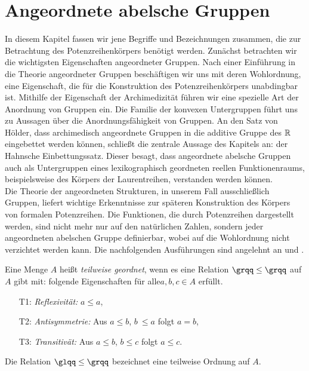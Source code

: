 \chapter{Angeordnete abelsche Gruppen}\label{chap2} %
In diesem Kapitel fassen wir jene Begriffe und Bezeichnungen zusammen, die zur Betrachtung des Potenzreihenkörpers benötigt werden. Zunächst betrachten wir die wichtigsten Eigenschaften angeordneter Gruppen. Nach einer Einführung in die Theorie angeordneter Gruppen beschäftigen wir uns mit deren Wohlordnung, eine Eigenschaft, die für die Konstruktion des Potenzreihenkörpers unabdingbar ist. Mithilfe der Eigenschaft der Archimedizität führen wir eine spezielle Art der Anordnung von Gruppen ein. Die Familie der konvexen Untergruppen führt uns zu Aussagen über die Anordnungsfähigkeit von Gruppen. An den Satz von Hölder, dass archimedisch angeordnete Gruppen in die additive Gruppe des $\mathbb{R}$ eingebettet werden können,  schließt die zentrale Aussage des Kapitels an: der Hahnsche Einbettungssatz. Dieser besagt, dass angeordnete abelsche Gruppen auch als Untergruppen eines lexikographisch geordneten reellen Funktionenraums, beispielsweise des Körpers der Laurentreihen, verstanden werden können. \\
Die Theorie der angeordneten Strukturen, in unserem Fall ausschließlich Gruppen, liefert wichtige Erkenntnisse zur späteren Konstruktion des Körpers von formalen Potenzreihen. Die Funktionen, die durch Potenzreihen dargestellt werden, sind nicht mehr nur auf den natürlichen Zahlen, sondern jeder angeordneten abelschen Gruppe definierbar, wobei auf die Wohlordnung nicht verzichtet werden kann. 
Die nachfolgenden Ausführungen sind angelehnt an \cite[S. 21 - 28]{fuchs66} und \cite[S. 1 -  4]{priesscrampe83}.
%
%
\begin{defn}\label{defgs} 
Eine Menge $A$ heißt \textit{teilweise geordnet}, wenn es eine Relation $ \grqq\leq\grqq $ auf $A$ gibt mit: folgende Eigenschaften für alle$ a,b,c \in A$  erfüllt.
%
\begin{enumerate}
\item[T1:] \textit{Reflexivität: } $a \leq  a$,
\item[T2:] \textit{Antisymmetrie: } Aus $a \leq  b$, $b~ \leq a$ folgt $a = b$,
\item[T3:] \textit{Transitivät: } Aus $a \leq b$, $b \leq c$ folgt $a \leq c$.
\end{enumerate}
%
Die Relation $\glqq \leq\grqq$ bezeichnet eine teilweise Ordnung auf $A$.
\end{defn}
